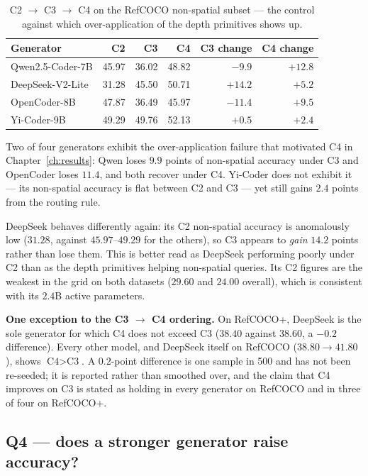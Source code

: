 \begin{table}[htbp]\centering
\caption{C2 $\to$ C3 $\to$ C4 on the RefCOCO non-spatial subset --- the control
against which over-application of the depth primitives shows up.}
\label{tab:m4-q3}
\begin{tabular}{@{}lrrrrr@{}}
\toprule
\textbf{Generator} & \textbf{C2} & \textbf{C3} & \textbf{C4} & \textbf{C3 change} & \textbf{C4 change} \\
\midrule
Qwen2.5-Coder-7B & 45.97 & 36.02 & 48.82 & $-9.9$ & $+12.8$ \\
DeepSeek-V2-Lite & 31.28 & 45.50 & 50.71 & $+14.2$ & $+5.2$ \\
OpenCoder-8B & 47.87 & 36.49 & 45.97 & $-11.4$ & $+9.5$ \\
Yi-Coder-9B & 49.29 & 49.76 & 52.13 & $+0.5$ & $+2.4$ \\
\bottomrule
\end{tabular}
\end{table}

Two of four generators exhibit the over-application failure that motivated C4 in
Chapter~\ref{ch:results}: Qwen loses $9.9$ points of non-spatial accuracy under C3
and OpenCoder loses $11.4$, and both recover under C4. Yi-Coder does not exhibit it
--- its non-spatial accuracy is flat between C2 and C3 --- yet still gains $2.4$
points from the routing rule.

DeepSeek behaves differently again: its C2 non-spatial accuracy is anomalously low
($31.28$, against $45.97$--$49.29$ for the others), so C3 appears to \emph{gain}
$14.2$ points rather than lose them. This is better read as DeepSeek performing poorly
under C2 than as the depth primitives helping non-spatial queries. Its C2 figures are
the weakest in the grid on both datasets ($29.60$ and $24.00$ overall), which is
consistent with its $2.4$B active parameters.

\textbf{One exception to the C3 $\to$ C4 ordering.} On RefCOCO+, DeepSeek is the sole
generator for which C4 does not exceed C3 ($38.40$ against $38.60$, a $-0.2$
difference). Every other model, and DeepSeek itself on RefCOCO ($38.80 \to 41.80$),
shows $\text{C4} > \text{C3}$. A $0.2$-point difference is one sample in 500 and has
not been re-seeded; it is reported rather than smoothed over, and the claim that C4
improves on C3 is stated as holding in every generator on RefCOCO and in three of four
on RefCOCO+.

\subsection{Q4 --- does a stronger generator raise accuracy?}

